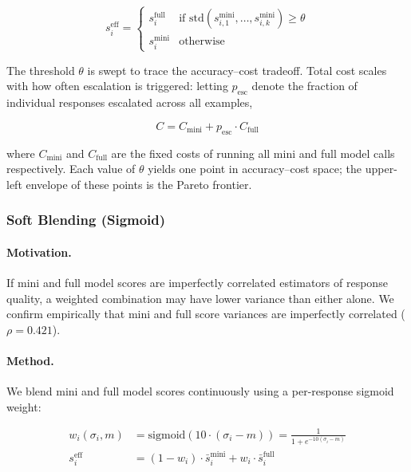 \documentclass{article}
\begin{document}
\begin{equation}
s_i^{\text{eff}} = \begin{cases}
s_i^{\text{full}} & \text{if } \text{std}(s_{i,1}^{\text{mini}}, \ldots, s_{i,k}^{\text{mini}}) \geq \theta \\
s_i^{\text{mini}} & \text{otherwise}
\end{cases}
\label{eq:hard-routing}
\end{equation}

The threshold $\theta$ is swept to trace the accuracy--cost tradeoff. Total cost scales with how often escalation is triggered: letting $p_{\text{esc}}$ denote the fraction of individual responses escalated across all examples,

\begin{equation}
C = C_{\text{mini}} + p_{\text{esc}} \cdot C_{\text{full}}
\label{eq:escalation-cost}
\end{equation}

where $C_{\text{mini}}$ and $C_{\text{full}}$ are the fixed costs of running all mini and full model calls respectively. Each value of $\theta$ yields one point in accuracy--cost space; the upper-left envelope of these points is the Pareto frontier.

\subsubsection{Soft Blending (Sigmoid)}
\label{sec:soft-blending}

\paragraph{Motivation.} If mini and full model scores are imperfectly correlated estimators of response quality, a weighted combination may have lower variance than either alone. We confirm empirically that mini and full score variances are imperfectly correlated ($\rho = 0.421$).

\paragraph{Method.} We blend mini and full model scores continuously using a per-response sigmoid weight:

\begin{align}
w_i(\sigma_i, m) &= \text{sigmoid}\left(10 \cdot (\sigma_i - m)\right) = \frac{1}{1 + e^{-10(\sigma_i - m)}} \label{eq:sigmoid-weight} \\
s_i^{\text{eff}} &= (1 - w_i) \cdot \bar{s}_i^{\text{mini}} + w_i \cdot \bar{s}_i^{\text{full}} \label{eq:soft-blend}
\end{align}
\end{document}
